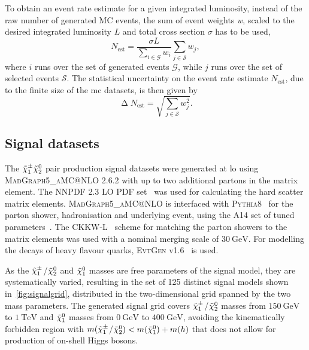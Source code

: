 To obtain an event rate estimate for a given integrated luminosity, instead of the raw number of generated MC events, the sum of event weights \textit{w}, scaled to the desired integrated luminosity $L$ and total cross section $\sigma$ has to be used,
\begin{equation}
	N_\mathrm{est} =\frac{\sigma L}{\sum_{i\in\mathcal{G}}w_i} \sum_{j\in\mathcal{S}}w_j,
\end{equation}
where $i$ runs over the set of generated events $\mathcal{G}$, while $j$ runs over the set of selected events $\mathcal{S}$. The statistical uncertainty on the event rate estimate $N_\mathrm{est}$, due to the finite size of the \gls{mc} datasets, is then given by
 \begin{equation}
	\upDelta N_\mathrm{est} = \sqrt{\sum_{j\in\mathcal{S}}w_j^2}.
\end{equation}

\subsection{Signal datasets}\label{sec:signal_samples}

The $\tilde{\chi}_1^\pm\tilde{\chi}_2^0$ pair production signal datasets were generated at \gls{lo} using \textsc{MadGraph5\_aMC@NLO} 2.6.2 \cite{MGaMCNLO:2014hca,Frederix:2012ps} with up to two additional partons in the matrix element. The NNPDF 2.3 LO \gls{PDF} set~\cite{Ball:2012cx} was used for calculating the hard scatter matrix elements.
\textsc{MadGraph5\_aMC@NLO} is interfaced with \textsc{Pythia8}~\cite{Pythia8:2007gs} for the parton shower, hadronisation and underlying event, using the A14 set of tuned parameters~\cite{ATL-PHYS-PUB-2014-021}. The CKKW-L~\cite{Lonnblad:2011xx} scheme for matching the parton showers to the matrix elements was used with a nominal merging scale of $\SI{30}{\GeV}$.
For modelling the decays of heavy flavour quarks, \textsc{EvtGen} v1.6~\cite{Lange:2001uf} is used. 

As the $\tilde{\chi}_1^\pm$/$\tilde{\chi}_2^0$ and $\tilde{\chi}_1^0$ masses are free parameters of the signal model, they are systematically varied, resulting in the set of 125 distinct signal models shown in~\cref{fig:signalgrid}, distributed in the two-dimensional grid spanned by the two mass parameters.
The generated signal grid covers $\tilde{\chi}_1^\pm$/$\tilde{\chi}_2^0$ masses from $\SI{150}{\GeV}$ to $\SI{1}{\TeV}$ and $\tilde{\chi}_1^0$ masses from $\SI{0}{\GeV}$ to $\SI{400}{\GeV}$, avoiding the kinematically forbidden region with \mbox{$m(\tilde{\chi}_1^\pm$/$\tilde{\chi}_2^0) < m(\tilde{\chi}_1^0) + m(h)$} that does not allow for production of on-shell Higgs bosons.

